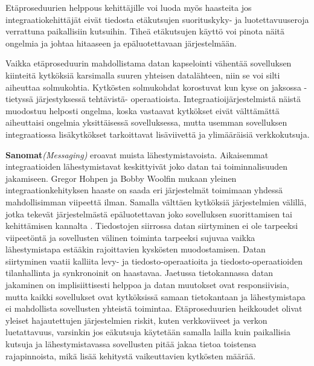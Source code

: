 Etäproseduurien helppous kehittäjille voi luoda myös haasteita jos integraatiokehittäjät eivät tiedosta etäkutsujen suorituskyky- ja luotettavuuseroja verrattuna paikallisiin kutsuihin. Tiheä etäkutsujen käyttö voi pinota näitä ongelmia ja johtaa hitaaseen ja epäluotettavaan järjestelmään.

Vaikka etäproseduurin mahdollistama datan kapselointi vähentää sovelluksen kiinteitä kytköksiä karsimalla suuren yhteisen datalähteen, niin se voi silti aiheuttaa solmukohtia. Kytkösten solmukohdat korostuvat kun kyse on jaksossa - tietyssä järjestyksessä tehtävistä- operaatioista.
Integraatioijärjestelmistä näistä muodostuu helposti ongelma, koska vastaavat kytkökset eivät välttämättä aiheuttaisi ongelmia yksittäisessä sovelluksessa, mutta usemman sovelluksen integraatiossa lisäkytkökset tarkoittavat lisäviivettä ja ylimääräisiä verkkokutsuja.

\textbf{Sanomat}\textit{(Messaging)} eroavat muista lähestymistavoista. Aikaisemmat integraatioiden lähestymistavat keskittyivät joko datan tai toiminnalisuuden jakamiseen. Gregor Hohpen ja Bobby Woolfin mukaan yleinen integraationkehityksen haaste on saada eri järjestelmät toimimaan yhdessä mahdollisimman viipeettä ilman. Samalla välttäen kytköksiä järjestelmien välillä, jotka tekevät järjestelmästä epäluotettavan joko sovelluksen suorittamisen tai kehittämisen kannalta \citep[sivu~72]{Hohpe2004}. Tiedostojen siirrossa datan siirtyminen ei ole tarpeeksi viipeetöntä ja sovellusten välinen toiminta tarpeeksi sujuvaa vaikka lähestymistapa estääkin rajoittavien kyskösten muodostamisen. Datan siirtyminen vaatii kalliita levy- ja tiedosto-operaatioita ja tiedosto-operaatioiden tilanhallinta ja synkronoinit on haastavaa.
Jaetussa tietokannassa datan jakaminen on implisiittisesti helppoa ja datan muutokset ovat responsiivisia, mutta kaikki sovellukset ovat kytköksissä samaan tietokantaan ja lähestymistapa ei mahdollista sovellusten yhteistä toimintaa.
Etäproseduurien heikkoudet olivat yleiset hajautettujen järjestelmien riskit, kuten verkkoviiveet ja verkon luetattavuus, varsinkin jos eäkutsuja käytetään samalla lailla kuin paikallisia kutsuja ja lähestymistavassa sovellusten pitää jakaa tietoa toistensa rajapinnoista, mikä lisää kehitystä vaikeuttavien kytkösten määrää.


